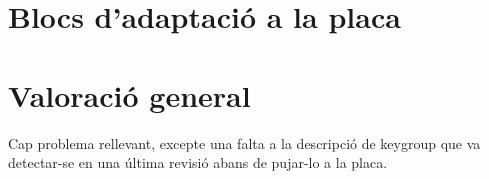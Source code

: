 \section{Blocs d'adaptació a la placa}

\section{Valoració general}

Cap problema rellevant, excepte una falta a la descripció de \textsf{keygroup} que
va detectar-se en una última revisió abans de pujar-lo a la placa.
